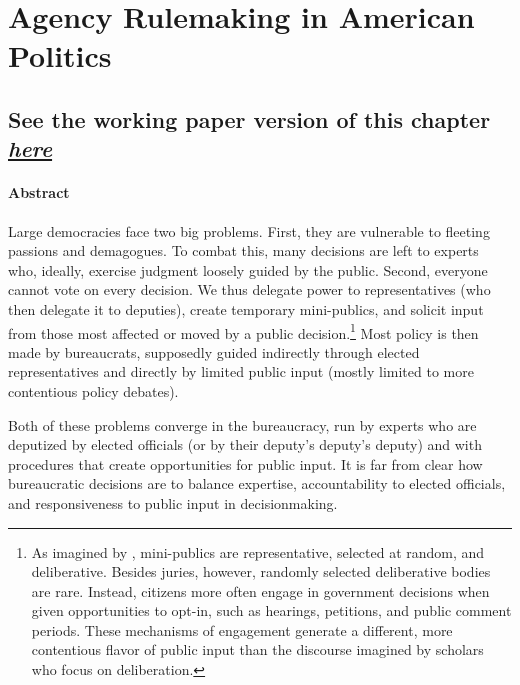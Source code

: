 \documentclass[
]{book}
\begin{document}
\hypertarget{agency-rulemaking-in-american-politics}{%
\chapter{Agency Rulemaking in American Politics}\label{agency-rulemaking-in-american-politics}}

\hypertarget{see-the-working-paper-version-of-this-chapter-here}{%
\section{\texorpdfstring{See the working paper version of this chapter \href{https://judgelord.github.io/dissertation/MacroRulemaking.pdf}{\emph{here}}}{See the working paper version of this chapter here}}\label{see-the-working-paper-version-of-this-chapter-here}}

\hypertarget{abstract}{%
\subsubsection*{Abstract}\label{abstract}}

Large democracies face two big problems. First, they are vulnerable to fleeting passions and demagogues. To combat this, many decisions are left to experts who, ideally, exercise judgment loosely guided by the public. Second, everyone cannot vote on every decision. We thus delegate power to representatives (who then delegate it to deputies), create temporary mini-publics, and solicit input from those most affected or moved by a public decision.\footnote{As imagined by \citet{Dahl1989}, mini-publics are representative, selected at random, and deliberative. Besides juries, however, randomly selected deliberative bodies are rare. Instead, citizens more often engage in government decisions when given opportunities to opt-in, such as hearings, petitions, and public comment periods. These mechanisms of engagement generate a different, more contentious flavor of public input than the discourse imagined by scholars who focus on deliberation.} Most policy is then made by bureaucrats, supposedly guided indirectly through elected representatives and directly by limited public input (mostly limited to more contentious policy debates).

Both of these problems converge in the bureaucracy, run by experts who are deputized by elected officials (or by their deputy's deputy's deputy) and with procedures that create opportunities for public input. It is far from clear how bureaucratic decisions are to balance expertise, accountability to elected officials, and responsiveness to public input in decisionmaking.
\end{document}
